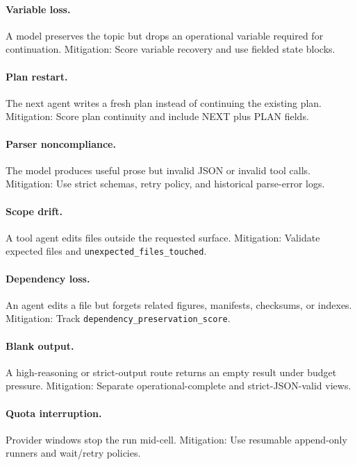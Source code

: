 \documentclass[11pt]{article}
\begin{document}
\paragraph{Variable loss.} A model preserves the topic but drops an operational variable required for continuation. Mitigation: Score variable recovery and use fielded state blocks.


\paragraph{Plan restart.} The next agent writes a fresh plan instead of continuing the existing plan. Mitigation: Score plan continuity and include NEXT plus PLAN fields.


\paragraph{Parser noncompliance.} The model produces useful prose but invalid JSON or invalid tool calls. Mitigation: Use strict schemas, retry policy, and historical parse-error logs.


\paragraph{Scope drift.} A tool agent edits files outside the requested surface. Mitigation: Validate expected files and \texttt{unexpected\_files\_touched}.


\paragraph{Dependency loss.} An agent edits a file but forgets related figures, manifests, checksums, or indexes. Mitigation: Track \texttt{dependency\_preservation\_score}.


\paragraph{Blank output.} A high-reasoning or strict-output route returns an empty result under budget pressure. Mitigation: Separate operational-complete and strict-JSON-valid views.


\paragraph{Quota interruption.} Provider windows stop the run mid-cell. Mitigation: Use resumable append-only runners and wait/retry policies.
\end{document}
